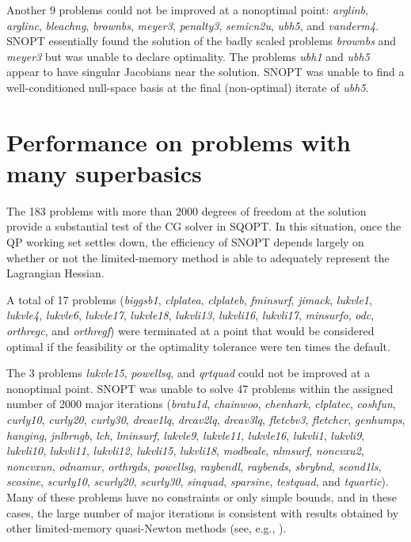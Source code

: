 \documentclass[draft,leqno,onefignum,onetabnum]{siamltex}
\def\SNOPT {{\small SNOPT}}
\def\SQOPT {{\small SQOPT}}
\def\Cute#1{\hbox{\it\lowercase{#1}\/}}
\begin{document}
Another 9 problems could not be improved at a nonoptimal point:
\Cute{ARGLINB},  %
\Cute{ARGLINC},  %
\Cute{BLEACHNG}, %
\Cute{BROWNBS},  %
\Cute{MEYER3},   %
\Cute{PENALTY3}, %
\Cute{SEMICN2U}, %
\Cute{UBH5},     %
and
\Cute{VANDERM4}. %
\SNOPT{} essentially found the solution of the badly scaled problems
\Cute{BROWNBS} and \Cute{MEYER3} but was unable to declare optimality.
The problems \Cute{UBH1} and \Cute{UBH5} appear to have singular
Jacobians near the solution.  \SNOPT{} was unable to find a
well-conditioned null-space basis at the final (non-optimal) iterate
of \Cute{UBH5}.

\section*{Performance on problems with many superbasics}

The 183 problems with more than 2000 degrees of freedom at the
solution provide a substantial test of the CG solver in \SQOPT.  In
this situation, once the QP working set settles down, the efficiency
of \SNOPT{}  depends largely on whether or not the limited-memory
method is able to adequately represent the Lagrangian Hessian.

A total of 17 problems
(\Cute{BIGGSB1},
\Cute{CLPLATEA},
\Cute{CLPLATEB},
\Cute{FMINSURF},
\Cute{JIMACK},
\Cute{LUKVLE1},
\Cute{LUKVLE4},
\Cute{LUKVLE6},
\Cute{LUKVLE17},
\Cute{LUKVLE18},
\Cute{LUKVLI13},
\Cute{LUKVLI16},
\Cute{LUKVLI17},
\Cute{MINSURFO},
\Cute{ODC},
{\it orth\-regc},
and
\Cute{ORTHREGF})
were terminated at a point that would be considered optimal if the
feasibility or the optimality tolerance were ten
times the default.


The 3 problems \Cute{LUKVLE15}, \Cute{POWELLSQ}, and \Cute{QRTQUAD}
could not be improved at a nonoptimal point. \SNOPT{} was unable to
solve 47 problems within the assigned number of 2000 major iterations
(\Cute{BRATU1D},     %
\Cute{CHAINWOO},    %
\Cute{CHENHARK},    %
\Cute{CLPLATEC},    %
\Cute{COSHFUN},     %
\Cute{CURLY10},     %
\Cute{CURLY20},     %
\Cute{CURLY30},     %
\Cute{DRCAV1LQ},    %
\Cute{DRCAV2LQ},    %
\Cute{DRCAV3LQ},    %
\Cute{FLETCBV3},    %
\Cute{FLETCHCR},    %
\Cute{GENHUMPS},    %
\Cute{HANGING},     %
\Cute{JNLBRNGB},    %
\Cute{LCH},         %
\Cute{LMINSURF},    %
\Cute{LUKVLE9},     %
\Cute{LUKVLE11},    %
\Cute{LUKVLE16},    %
\Cute{LUKVLI1},     %
\Cute{LUKVLI9},     %
\Cute{LUKVLI10},    %
\Cute{LUKVLI11},    %
\Cute{LUKVLI12},    %
\Cute{LUKVLI15},    %
\Cute{LUKVLI18},    %
\Cute{MODBEALE},    %
\Cute{NLMSURF},     %
\Cute{NONCVXU2},    %
\Cute{NONCVXUN},    %
\Cute{ODNAMUR},     %
{\it orth\-rgds},   %
\Cute{POWELLSG},    %
\Cute{RAYBENDL},    %
\Cute{RAYBENDS},    %
\Cute{SBRYBND},     %
\Cute{SCOND1LS},    %
\Cute{SCOSINE},     %
\Cute{SCURLY10},    %
\Cute{SCURLY20},    %
\Cute{SCURLY30},    %
\Cute{SINQUAD},     %
\Cute{SPARSINE},    %
\Cute{TESTQUAD},    %
and
\Cute{TQUARTIC}).   %
Many of these problems have no constraints or only simple bounds, and
in these cases, the large number of major iterations is consistent
with results obtained by other limited-memory quasi-Newton methods
(see, e.g., \cite{ByrLNZ95,GilL03}).
\end{document}
